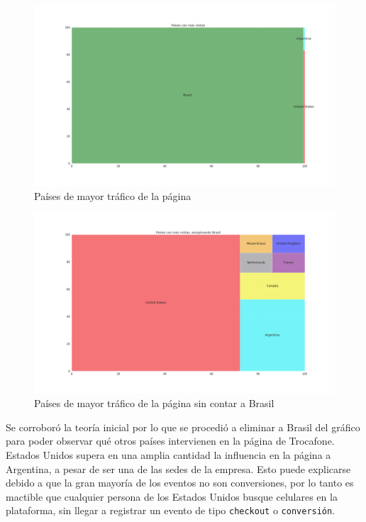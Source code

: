 \documentclass[a4paper]{article}
\begin{document}
\begin{figure}[h!]
	\includegraphics[width=\linewidth]{figures/050-paises_visitas-treemap.png}
	\caption{Países de mayor tráfico de la página}
	\label{brazilrules}
\end{figure}

\begin{figure}[h!]
	\includegraphics[width=\linewidth]{figures/051-paises_visitas_sin_brazil-treemap.png}
	\caption{Países de mayor tráfico de la página sin contar a Brasil}
	\label{brazilsucks}
\end{figure}

Se corroboró la teoría inicial por lo que se procedió a eliminar a Brasil del gráfico para poder observar qué otros países intervienen en la página de Trocafone. Estados Unidos supera en una amplia cantidad la influencia en la página a Argentina, a pesar de ser una de las sedes de la empresa. Esto puede explicarse debido a que la gran mayoría de los eventos no son conversiones, por lo tanto es mactible que cualquier persona de los Estados Unidos busque celulares en la plataforma, sin llegar a registrar un evento de tipo \texttt{checkout} o \texttt{conversión}.
\end{document}
